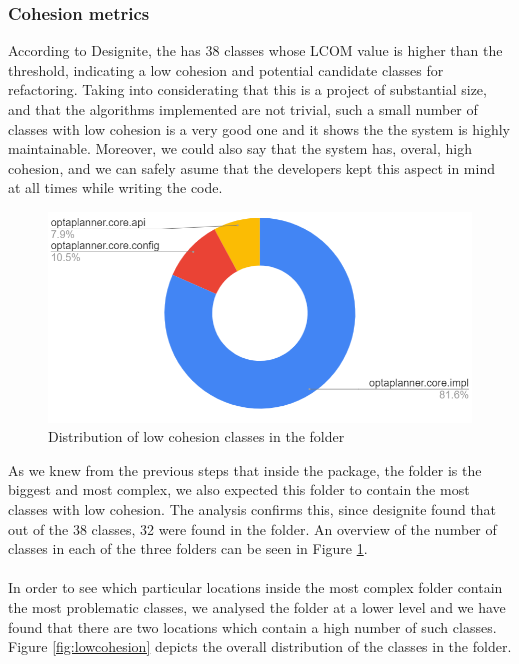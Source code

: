         \subsubsection{Cohesion metrics}
            According to Designite, the  has 38 classes whose LCOM value is higher than the threshold, indicating a low cohesion and potential candidate classes for refactoring. 
            Taking into considerating that this is a project of substantial size, and that the algorithms implemented are not trivial, such a small number of classes with low cohesion is a very good one and it shows the the system is highly maintainable. Moreover, we could also say that the system has, overal, high cohesion, and we can safely asume that the developers kept this aspect in mind at all times while writing the code. 
            \begin{figure}[H]
                \centering
                \includegraphics[scale=0.6]{figures/step4/corelowcohesion.PNG}
                \caption{Distribution of low cohesion classes in the  folder}
                \label{fig:corelowcohesion}
            \end{figure}
            As we knew from the previous steps that inside the  package, the  folder is the biggest and most complex, we also expected this folder to contain the most classes with low cohesion. The analysis confirms this, since designite found that out of the 38 classes, 32 were found in the  folder. An overview of the number of classes in each of the three folders can be seen in Figure \ref{fig:corelowcohesion}. 
            \\\\
            In order to see which particular locations inside the most complex folder contain the most problematic classes, we analysed the  folder at a lower level and we have found that there are two locations which contain a high number of such classes. Figure \ref{fig:lowcohesion} depicts the overall distribution of the classes in the  folder. 
